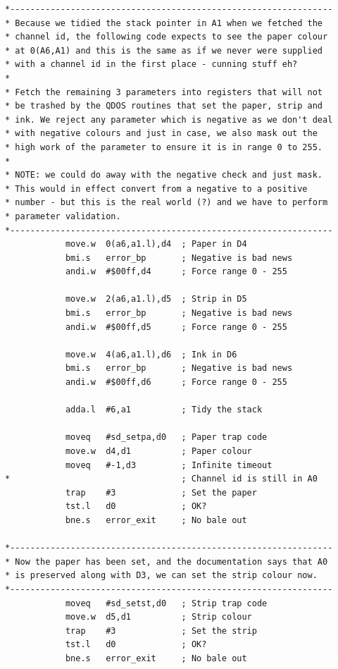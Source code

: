 \begin{lstlisting}[firstnumber=last,caption={PSI\_CLS - The Final Version - Part 2},label={lst:PsiClsFinalVersionPart2}]
*----------------------------------------------------------------
* Because we tidied the stack pointer in A1 when we fetched the 
* channel id, the following code expects to see the paper colour 
* at 0(A6,A1) and this is the same as if we never were supplied 
* with a channel id in the first place - cunning stuff eh?
*
* Fetch the remaining 3 parameters into registers that will not 
* be trashed by the QDOS routines that set the paper, strip and
* ink. We reject any parameter which is negative as we don't deal
* with negative colours and just in case, we also mask out the 
* high work of the parameter to ensure it is in range 0 to 255.
*
* NOTE: we could do away with the negative check and just mask. 
* This would in effect convert from a negative to a positive 
* number - but this is the real world (?) and we have to perform
* parameter validation.
*----------------------------------------------------------------
            move.w  0(a6,a1.l),d4  ; Paper in D4
            bmi.s   error_bp       ; Negative is bad news
            andi.w  #$00ff,d4      ; Force range 0 - 255

            move.w  2(a6,a1.l),d5  ; Strip in D5
            bmi.s   error_bp       ; Negative is bad news
            andi.w  #$00ff,d5      ; Force range 0 - 255

            move.w  4(a6,a1.l),d6  ; Ink in D6
            bmi.s   error_bp       ; Negative is bad news
            andi.w  #$00ff,d6      ; Force range 0 - 255

            adda.l  #6,a1          ; Tidy the stack

            moveq   #sd_setpa,d0   ; Paper trap code
            move.w  d4,d1          ; Paper colour
            moveq   #-1,d3         ; Infinite timeout
*                                  ; Channel id is still in A0
            trap    #3             ; Set the paper
            tst.l   d0             ; OK?
            bne.s   error_exit     ; No bale out

*----------------------------------------------------------------
* Now the paper has been set, and the documentation says that A0
* is preserved along with D3, we can set the strip colour now.
*----------------------------------------------------------------
            moveq   #sd_setst,d0   ; Strip trap code
            move.w  d5,d1          ; Strip colour
            trap    #3             ; Set the strip
            tst.l   d0             ; OK?
            bne.s   error_exit     ; No bale out


\end{lstlisting}
